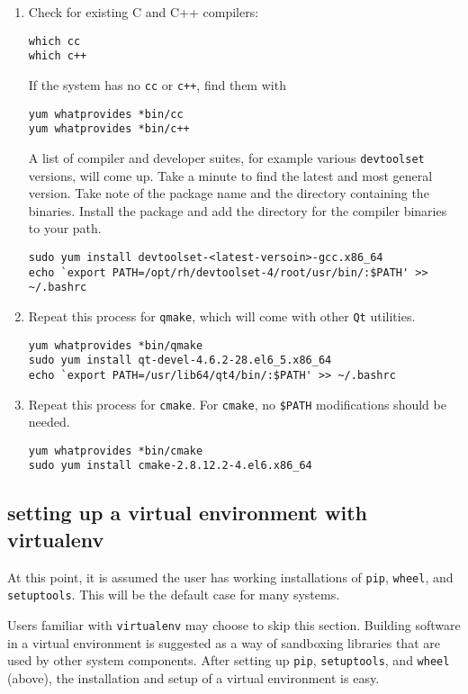 \begin{enumerate}
\item 
Check for existing C and C++ compilers:
\begin{lstlisting}
which cc
which c++
\end{lstlisting}
If the system has no \verb|cc| or \verb|c++|,
find them with 
\begin{lstlisting}
yum whatprovides *bin/cc
yum whatprovides *bin/c++
\end{lstlisting}
A list of compiler and developer suites, 
for example various \verb|devtoolset| versions, will come up.
Take a minute to find
the latest and most general version.
Take note of the package name and the directory containing the binaries.
Install the package and add the directory for the compiler binaries to your path.
\begin{lstlisting}
sudo yum install devtoolset-<latest-versoin>-gcc.x86_64 
echo `export PATH=/opt/rh/devtoolset-4/root/usr/bin/:$PATH' >> ~/.bashrc
\end{lstlisting}

\item 
Repeat this process for \verb|qmake|, which will come with other \verb|Qt| utilities.
\begin{lstlisting}
yum whatprovides *bin/qmake
sudo yum install qt-devel-4.6.2-28.el6_5.x86_64 
echo `export PATH=/usr/lib64/qt4/bin/:$PATH' >> ~/.bashrc
\end{lstlisting}

\item 
Repeat this process for \verb|cmake|. 
For \verb|cmake|, no \verb|$PATH| modifications should be needed.
\begin{lstlisting}
yum whatprovides *bin/cmake
sudo yum install cmake-2.8.12.2-4.el6.x86_64 
\end{lstlisting}

\end{enumerate}


\subsection{setting up a virtual environment with virtualenv}
\label{subsec:virtualenv}

At this point, it is assumed the user has working installations of
\verb|pip|, \verb|wheel|, and \verb|setuptools|.
This will be the default case for many systems.

Users familiar with \verb|virtualenv| may choose to skip this section.
Building software in a virtual environment is suggested 
as a way of sandboxing libraries that are used by other system components.
After setting up \verb|pip|, \verb|setuptools|, and \verb|wheel| (above),
the installation and setup of a virtual environment is easy.

